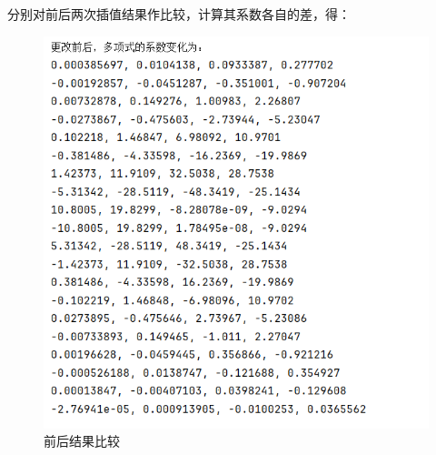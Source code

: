 \documentclass[12pt,a4paper,oneside]{article}
\begin{document}
分别对前后两次插值结果作比较，计算其系数各自的差，得：
\begin{figure}[H]
    \centering
    \includegraphics[scale = 0.8]{figs/comp.png}
    \caption{前后结果比较}
\end{figure}
\end{document}
